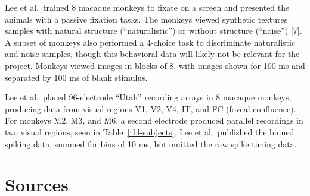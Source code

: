 \documentclass[
  letterpaper,
  DIV=11,
  numbers=noendperiod]{scrartcl}
\begin{document}
Lee et al.~trained 8 macaque monkeys to fixate on a screen and presented
the animals with a passive fixation tasks. The monkeys viewed synthetic
textures samples with natural structure (``naturalistic'') or without
structure (``noise'') {[}7{]}. A subset of monkeys also performed a
4-choice task to discriminate naturalistic and noise samples, though
this behavioral data will likely not be relevant for the project.
Monkeys viewed images in blocks of 8, with images shown for 100 ms and
separated by 100 ms of blank stimulus.

Lee et al.~placed 96-electrode ``Utah'' recording arrays in 8 macaque
monkeys, producing data from visual regions V1, V2, V4, IT, and FC
(foveal confluence). For monkeys M2, M3, and M6, a second electrode
produced parallel recordings in two visual regions, seen in
Table~\ref{tbl-subjects}. Lee et al.~published the binned spiking data,
summed for bins of 10 ms, but omitted the raw spike timing data.

\begin{table}

\caption{\label{tbl-subjects}Description of the macaque monkey subjects
and relevant features of the recording data. For monkeys with more than
one recording over time, the youngest and oldest age recording, in
weeks, is reported as Age 1 and Age 2, respectively.}


\end{table}%

\section{Sources}\label{sources}
\end{document}
